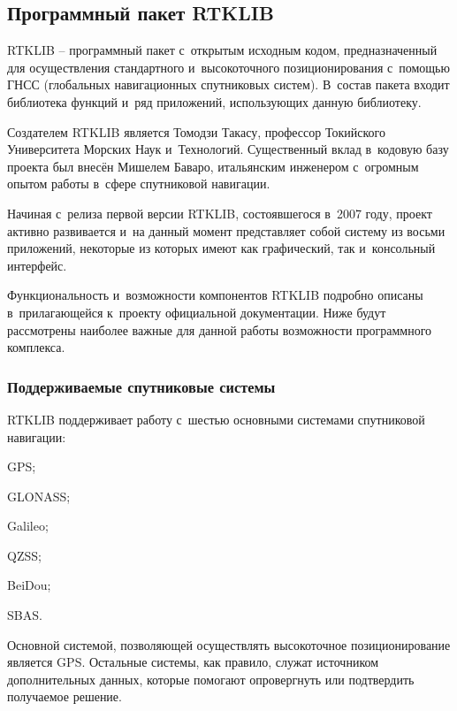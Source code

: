 \subsection{Программный пакет RTKLIB}

RTKLIB -- программный пакет с~открытым исходным кодом, предназначенный для осуществления стандартного и~высокоточного позиционирования с~помощью ГНСС (глобальных навигационных спутниковых систем). В~состав пакета входит библиотека функций и~ряд приложений, использующих данную библиотеку. \par

Создателем RTKLIB является Томодзи Такасу, профессор Токийского Университета Морских Наук и~Технологий. Существенный вклад в~кодовую базу проекта был внесён Мишелем Баваро, итальянским инженером с~огромным опытом работы в~сфере спутниковой навигации. \par

Начиная с~релиза первой версии RTKLIB, состоявшегося в~2007 году, проект активно развивается и~на данный момент представляет собой систему из восьми приложений, некоторые из которых имеют как графический, так и~консольный интерфейс. \par

Функциональность и~возможности компонентов RTKLIB подробно описаны в~прилагающейся к~проекту официальной документации. Ниже будут рассмотрены наиболее важные для данной работы возможности программного комплекса.

\subsubsection{Поддерживаемые спутниковые системы}

RTKLIB поддерживает работу с~шестью основными системами спутниковой навигации:

\begin{dashitemize}
  \item GPS;
  \item GLONASS;
  \item Galileo;
  \item QZSS;
  \item BeiDou;
  \item SBAS.
\end{dashitemize}

Основной системой, позволяющей осуществлять высокоточное позиционирование является GPS. Остальные системы, как правило, служат источником дополнительных данных, которые помогают опровергнуть или подтвердить получаемое решение.

